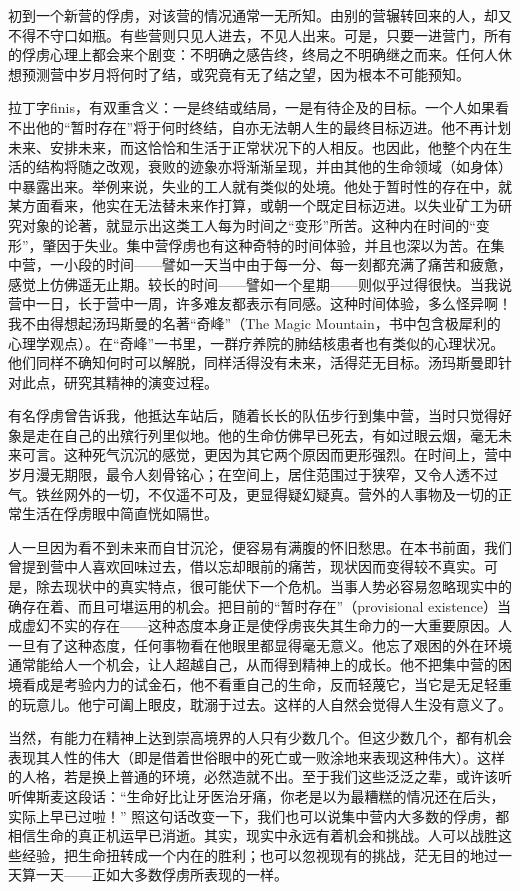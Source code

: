 \documentclass[11pt,oneside]{book}
\begin{document}
\begin{common-format}
初到一个新营的俘虏，对该营的情况通常一无所知。由别的营辗转回来的人，却又不得不守口如瓶。有些营则只见人进去，不见人出来。可是，只要一进营门，所有的俘虏心理上都会来个剧变：不明确之感告终，终局之不明确继之而来。任何人休想预测营中岁月将何时了结，或究竟有无了结之望，因为根本不可能预知。

拉丁字finis，有双重含义：一是终结或结局，一是有待企及的目标。一个人如果看不出他的“暂时存在”将于何时终结，自亦无法朝人生的最终目标迈进。他不再计划未来、安排未来，而这恰恰和生活于正常状况下的人相反。也因此，他整个内在生活的结构将随之改观，衰败的迹象亦将渐渐呈现，并由其他的生命领域（如身体）中暴露出来。举例来说，失业的工人就有类似的处境。他处于暂时性的存在中，就某方面看来，他实在无法替未来作打算，或朝一个既定目标迈进。以失业矿工为研究对象的论著，就显示出这类工人每为时间之“变形”所苦。这种内在时间的“变形”，肇因于失业。集中营俘虏也有这种奇特的时间体验，并且也深以为苦。在集中营，一小段的时间——譬如一天当中由于每一分、每一刻都充满了痛苦和疲惫，感觉上仿佛遥无止期。较长的时间——譬如一个星期——则似乎过得很快。当我说营中一日，长于营中一周，许多难友都表示有同感。这种时间体验，多么怪异啊！我不由得想起汤玛斯曼的名著“奇峰”（The Magic Mountain，书中包含极犀利的心理学观点）。在“奇峰”一书里，一群疗养院的肺结核患者也有类似的心理状况。他们同样不确知何时可以解脱，同样活得没有未来，活得茫无目标。汤玛斯曼即针对此点，研究其精神的演变过程。

有名俘虏曾告诉我，他抵达车站后，随着长长的队伍步行到集中营，当时只觉得好象是走在自己的出殡行列里似地。他的生命仿佛早已死去，有如过眼云烟，毫无未来可言。这种死气沉沉的感觉，更因为其它两个原因而更形强烈。在时间上，营中岁月漫无期限，最令人刻骨铭心；在空间上，居住范围过于狭窄，又令人透不过气。铁丝网外的一切，不仅遥不可及，更显得疑幻疑真。营外的人事物及一切的正常生活在俘虏眼中简直恍如隔世。

人一旦因为看不到未来而自甘沉沦，便容易有满腹的怀旧愁思。在本书前面，我们曾提到营中人喜欢回味过去，借以忘却眼前的痛苦，现状因而变得较不真实。可是，除去现状中的真实特点，很可能伏下一个危机。当事人势必容易忽略现实中的确存在着、而且可堪运用的机会。把目前的“暂时存在”（provisional existence）当成虚幻不实的存在——这种态度本身正是使俘虏丧失其生命力的一大重要原因。人一旦有了这种态度，任何事物看在他眼里都显得毫无意义。他忘了艰困的外在环境通常能给人一个机会，让人超越自己，从而得到精神上的成长。他不把集中营的困境看成是考验内力的试金石，他不看重自己的生命，反而轻蔑它，当它是无足轻重的玩意儿。他宁可阖上眼皮，耽溺于过去。这样的人自然会觉得人生没有意义了。

当然，有能力在精神上达到崇高境界的人只有少数几个。但这少数几个，都有机会表现其人性的伟大（即是借着世俗眼中的死亡或一败涂地来表现这种伟大）。这样的人格，若是换上普通的环境，必然造就不出。至于我们这些泛泛之辈，或许该听听俾斯麦这段话：“生命好比让牙医治牙痛，你老是以为最糟糕的情况还在后头，实际上早已过啦！” 照这句话改变一下，我们也可以说集中营内大多数的俘虏，都相信生命的真正机运早已消逝。其实，现实中永远有着机会和挑战。人可以战胜这些经验，把生命扭转成一个内在的胜利；也可以忽视现有的挑战，茫无目的地过一天算一天——正如大多数俘虏所表现的一样。



\end{common-format}
\end{document}
